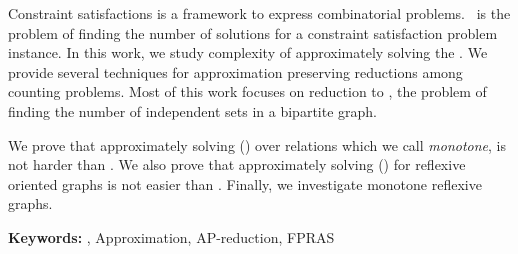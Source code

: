 
%
%

Constraint satisfactions is a framework to express combinatorial problems.
\ccsp\ is the problem of finding the number of solutions for a constraint satisfaction problem
instance. In this work, we study complexity of approximately solving the \ccsp\@. We
provide several techniques for approximation preserving reductions
among counting problems. Most of this work focuses on reduction to \cbis,
the problem of finding the number of independent sets in a bipartite graph.

We prove that approximately solving \ccsp(\mrelset) over relations which we call \emph{monotone},
is not harder than \cbis\@. We also prove that approximately
solving \chom(\mH) for reflexive oriented graphs is not easier than \cbis\@.
Finally, we investigate monotone reflexive graphs.

\vspace{1cm}

\noindent \textbf{Keywords:} \ccsp, Approximation, AP-reduction, FPRAS







